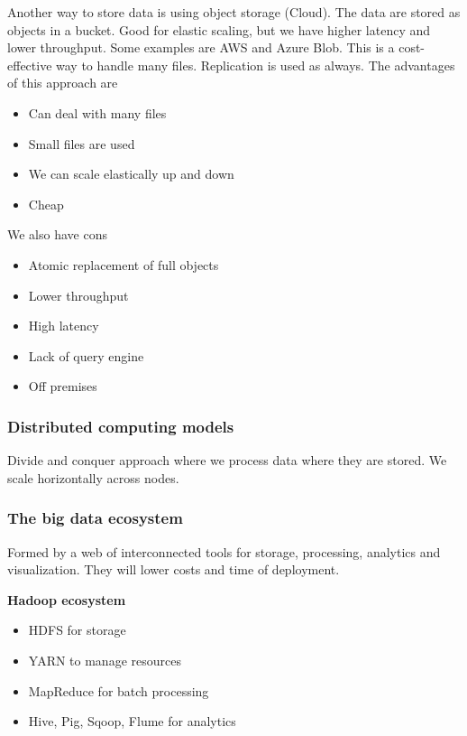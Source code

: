 Another way to store data is using object storage (Cloud). The data are stored as objects in a bucket. Good for elastic scaling, but we have higher latency and lower throughput.  Some examples are AWS and Azure Blob. This is a cost-effective way to handle many files. Replication is used as always. The advantages of this approach are

\begin{itemize}
    \item Can deal with many files
    \item Small files are used
    \item We can scale elastically up and down
    \item Cheap
\end{itemize}

We also have cons

\begin{itemize}
    \item Atomic replacement of full objects
    \item Lower throughput
    \item High latency
    \item Lack of query engine 
    \item Off premises
\end{itemize}

\subsubsection{Distributed computing models}

Divide and conquer approach where we process data where they are stored. We scale horizontally across nodes. 

\subsubsection{The big data ecosystem}

Formed by a web of interconnected tools for storage, processing, analytics and visualization. They will lower costs and time of deployment. 

\vspace{10pt}

\textbf{Hadoop ecosystem}
\begin{itemize}
    \item HDFS for storage
    \item YARN to manage resources
    \item MapReduce for batch processing
    \item Hive, Pig, Sqoop, Flume for analytics
\end{itemize}

